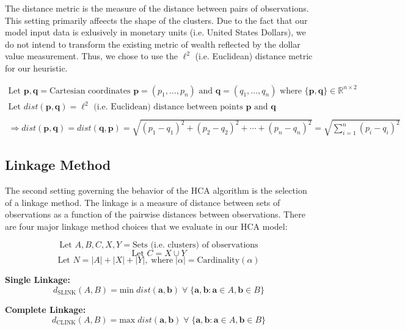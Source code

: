 \documentclass[../main.tex]{subfiles}
\begin{document}
The distance metric is the measure of the distance between pairs of observations. This setting primarily affeects the shape of the clusters. Due to the fact that our model input data is exlusively in monetary units (i.e. United States Dollars), we do not intend to transform the existing metric of wealth reflected by the dollar value measurement. Thus, we chose to use the $\ell^2$ (i.e. Euclidean) distance metric for our heuristic.

\begin{gather*}
    \text{Let $\boldsymbol{p}, \boldsymbol{q}$} = \text{Cartesian coordinates $\boldsymbol{p} = (p_1, \ldots, p_n)$ and $\boldsymbol{q} = (q_1, \ldots, q_n)$ where $\{\boldsymbol{p}, \boldsymbol{q}\} \in \mathbb{R}^{n \times 2}$} \\
    \text{Let $dist(\boldsymbol{p},\boldsymbol{q})$} = \text{$\ell^2$ (i.e. Euclidean) distance between points $\boldsymbol{p}$ and $\boldsymbol{q}$} \\
    \\
    \Rightarrow dist(\boldsymbol{p}, \boldsymbol{q}) = dist(\boldsymbol{q}, \boldsymbol{p})
    = \sqrt{(p_1 - q_1)^2 + (p_2 - q_2)^2 + \cdots + (p_n - q_n)^2}
    = \sqrt{\sum_{i=1}^n (p_i - q_i)^2}
\end{gather*}

\subsection{Linkage Method}

The second setting governing the behavior of the HCA algorithm is the selection of a linkage method. The linkage is a measure of distance between sets of observations as a function of the pairwise distances between observations. There are four major linkage method choices that we evaluate in our HCA model:


    $$ \text{Let $A, B, C, X, Y$} = \text{Sets (i.e. clusters) of observations} $$
    $$ \text{Let $C$} = X \cup Y $$
    $$ \text{Let $N$} = |A| + |X| + |Y|, \; \text{where} \; |\alpha| = \text{Cardinality}(\alpha) $$
    
\hspace{7em} \textbf{Single Linkage:}
        $$ d_\text{SLINK}(A, B) = \text{min} \; dist(\boldsymbol{a}, \boldsymbol{b})  \; \forall \; \{ \boldsymbol{a}, \boldsymbol{b} : \boldsymbol{a} \in A, \boldsymbol{b} \in B \} $$
    
\hspace{7em} \textbf{Complete Linkage:}
        $$ d_\text{CLINK}(A, B) = \text{max} \; dist(\boldsymbol{a}, \boldsymbol{b})  \; \forall \; \{ \boldsymbol{a}, \boldsymbol{b} : \boldsymbol{a} \in A, \boldsymbol{b} \in B \} $$
    
\end{document}
